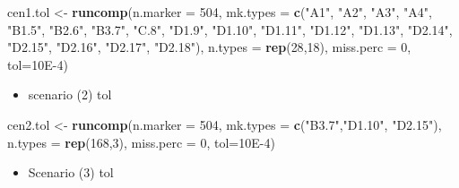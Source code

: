 \documentclass[]{article}
\newenvironment{Shaded}{\begin{snugshade}}{\end{snugshade}}
\newcommand{\DataTypeTok}[1]{\textcolor[rgb]{0.13,0.29,0.53}{#1}}
\newcommand{\DecValTok}[1]{\textcolor[rgb]{0.00,0.00,0.81}{#1}}
\newcommand{\FloatTok}[1]{\textcolor[rgb]{0.00,0.00,0.81}{#1}}
\newcommand{\KeywordTok}[1]{\textcolor[rgb]{0.13,0.29,0.53}{\textbf{#1}}}
\newcommand{\NormalTok}[1]{#1}
\newcommand{\StringTok}[1]{\textcolor[rgb]{0.31,0.60,0.02}{#1}}
\providecommand{\tightlist}{%
  \setlength{\itemsep}{0pt}\setlength{\parskip}{0pt}}
\begin{document}
\begin{Shaded}
\begin{Highlighting}[]
\NormalTok{cen1.tol <-}\StringTok{ }\KeywordTok{runcomp}\NormalTok{(}\DataTypeTok{n.marker =} \DecValTok{504}\NormalTok{, }
                    \DataTypeTok{mk.types =} \KeywordTok{c}\NormalTok{(}\StringTok{"A1"}\NormalTok{, }\StringTok{"A2"}\NormalTok{, }\StringTok{"A3"}\NormalTok{, }\StringTok{"A4"}\NormalTok{, }\StringTok{"B1.5"}\NormalTok{, }\StringTok{"B2.6"}\NormalTok{, }\StringTok{"B3.7"}\NormalTok{,}
                                 \StringTok{"C.8"}\NormalTok{, }\StringTok{"D1.9"}\NormalTok{, }\StringTok{"D1.10"}\NormalTok{, }\StringTok{"D1.11"}\NormalTok{, }\StringTok{"D1.12"}\NormalTok{, }\StringTok{"D1.13"}\NormalTok{,}
                                 \StringTok{"D2.14"}\NormalTok{, }\StringTok{"D2.15"}\NormalTok{, }\StringTok{"D2.16"}\NormalTok{, }\StringTok{"D2.17"}\NormalTok{, }\StringTok{"D2.18"}\NormalTok{),}
                    \DataTypeTok{n.types =} \KeywordTok{rep}\NormalTok{(}\DecValTok{28}\NormalTok{,}\DecValTok{18}\NormalTok{),}
                    \DataTypeTok{miss.perc =} \DecValTok{0}\NormalTok{, }\DataTypeTok{tol=}\FloatTok{10E-4}\NormalTok{)}
\end{Highlighting}
\end{Shaded}

\begin{itemize}
\tightlist
\item
  scenario (2) tol
\end{itemize}

\begin{Shaded}
\begin{Highlighting}[]
\NormalTok{cen2.tol <-}\StringTok{ }\KeywordTok{runcomp}\NormalTok{(}\DataTypeTok{n.marker =} \DecValTok{504}\NormalTok{, }
                    \DataTypeTok{mk.types =} \KeywordTok{c}\NormalTok{(}\StringTok{"B3.7"}\NormalTok{,}\StringTok{"D1.10"}\NormalTok{, }\StringTok{"D2.15"}\NormalTok{),}
                    \DataTypeTok{n.types =} \KeywordTok{rep}\NormalTok{(}\DecValTok{168}\NormalTok{,}\DecValTok{3}\NormalTok{),}
                    \DataTypeTok{miss.perc =} \DecValTok{0}\NormalTok{, }\DataTypeTok{tol=}\FloatTok{10E-4}\NormalTok{)}
\end{Highlighting}
\end{Shaded}

\begin{itemize}
\tightlist
\item
  Scenario (3) tol
\end{itemize}
\end{document}

